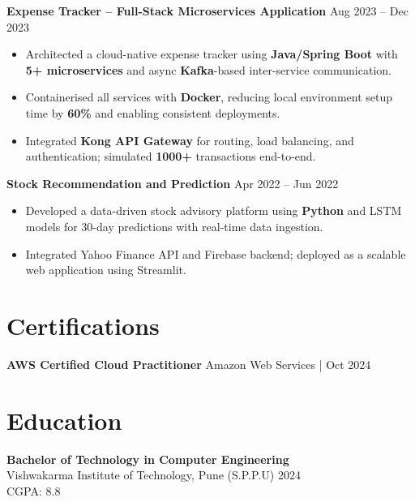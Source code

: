 \documentclass[a4paper,10pt]{article}
\begin{document}
\textbf{Expense Tracker -- Full-Stack Microservices Application} \hfill Aug 2023 -- Dec 2023
\begin{itemize}[leftmargin=*]
    \item Architected a cloud-native expense tracker using \textbf{Java/Spring Boot} with \textbf{5+ microservices} and async \textbf{Kafka}-based inter-service communication.
    \item Containerised all services with \textbf{Docker}, reducing local environment setup time by \textbf{60\%} and enabling consistent deployments.
    \item Integrated \textbf{Kong API Gateway} for routing, load balancing, and authentication; simulated \textbf{1000+} transactions end-to-end.
\end{itemize}
\textbf{Stock Recommendation and Prediction} \hfill Apr 2022 -- Jun 2022
\begin{itemize}[leftmargin=*]
    \item Developed a data-driven stock advisory platform using \textbf{Python} and LSTM models for 30-day predictions with real-time data ingestion.
    \item Integrated Yahoo Finance API and Firebase backend; deployed as a scalable web application using Streamlit.
\end{itemize}

\section*{Certifications}
\textbf{AWS Certified Cloud Practitioner} \hfill Amazon Web Services \;|\; Oct 2024 \\

\section*{Education}

\textbf{Bachelor of Technology in Computer Engineering} \\
Vishwakarma Institute of Technology, Pune (S.P.P.U) \hfill 2024 \\
CGPA: 8.8
\end{document}
